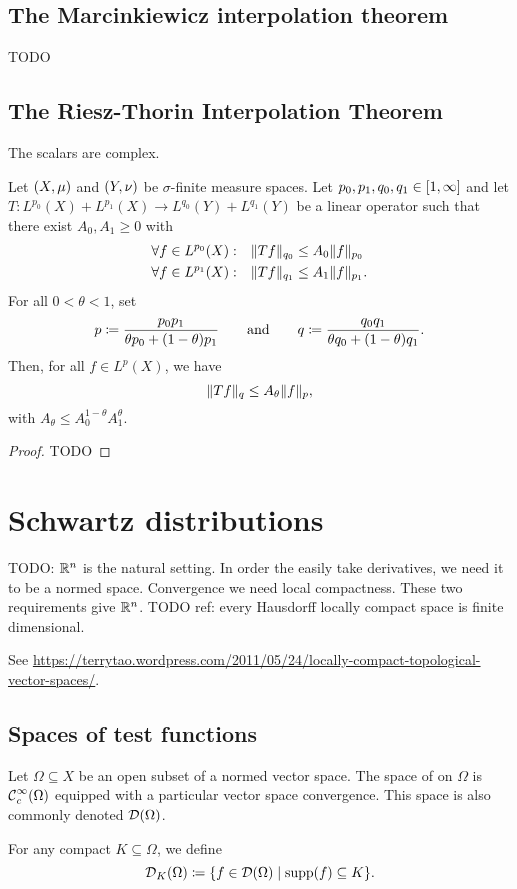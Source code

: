 \subsection{The Marcinkiewicz interpolation theorem}
TODO
\subsection{The Riesz-Thorin Interpolation Theorem}
The scalars are complex.

\begin{theorem}
Let $\sSet{X,\mu}$ and $\sSet{Y,\nu}$ be $\sigma$-finite measure spaces. Let $p_0,p_1,q_0,q_1\in \interval{1,\infty}$ and let $T: L^{p_0}(X) + L^{p_1}(X) \to L^{q_0}(Y) + L^{q_1}(Y)$ be a linear operator such that there exist $A_0,A_1 \geq 0$ with 
\begin{align*}
\forall f\in L^{p_0}(X): \quad &\lVert Tf\rVert_{q_0} \leq A_0 \lVert f\rVert_{p_0} \\
\forall f\in L^{p_1}(X): \quad &\lVert Tf\rVert_{q_1} \leq A_1 \lVert f\rVert_{p_1}.
\end{align*}
For all $0<\theta <1$, set
\[ p \coloneqq \frac{p_0p_1}{\theta p_0 + (1-\theta)p_1} \qquad\text{and}\qquad q \coloneqq \frac{q_0q_1}{\theta q_0 + (1-\theta)q_1}. \]
Then, for all $f\in L^p(X)$, we have
\[ \lVert Tf\rVert_{q} \leq A_\theta \lVert f\rVert_p, \]
with $A_\theta \leq A_0^{1-\theta}A_1^\theta$.
\end{theorem}
\begin{proof}
TODO
\end{proof}


\section{Schwartz distributions}
TODO: $\mathbb{R}^n$ is the natural setting. In order the easily take derivatives, we need it to be a normed space. Convergence we need local compactness. These two requirements give $\mathbb{R}^n$. TODO ref: every Hausdorff locally compact space is finite dimensional.

See \url{https://terrytao.wordpress.com/2011/05/24/locally-compact-topological-vector-spaces/}.


\subsection{Spaces of test functions}
\begin{definition}
Let $\Omega\subseteq X$ be an open subset of a normed vector space. The space of  on $\Omega$ is $\operatorname{\mathcal{C}}^\infty_c(\Omega)$ equipped with a particular vector space convergence. This space is also commonly denoted $\operatorname{\mathcal{D}}(\Omega)$.

For any compact $K\subseteq \Omega$, we define
\[ \testFuncs_K(\Omega) \defeq \setbuilder{f\in \testFuncs(\Omega)}{\supp(f) \subseteq K}. \]
\end{definition}

